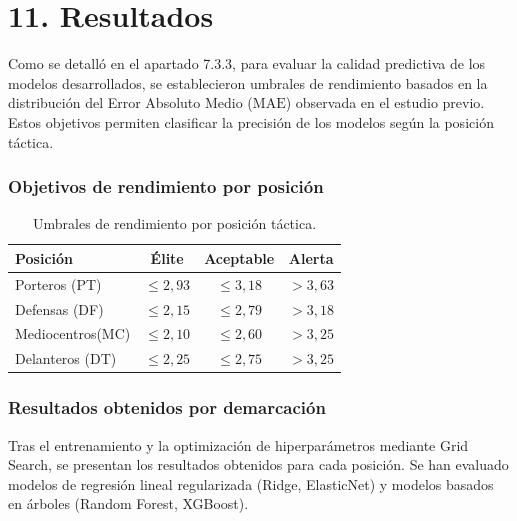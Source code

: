 
\section*{11. Resultados}
\label{sec:resultados}

Como se detalló en el apartado 7.3.3, para evaluar la calidad
predictiva de los modelos desarrollados, se establecieron umbrales
de rendimiento basados en la distribución del Error Absoluto Medio
($\mathrm{MAE}$) observada en el estudio previo. Estos objetivos
permiten clasificar la precisión de los modelos según la posición
táctica.

\subsubsection{Objetivos de rendimiento por posición}
\label{subsubsec:objetivos_rendimiento}

\begin{table}[H]
\centering
\small
\begin{tabular}{|l|c|c|c|}
\hline
\textbf{Posición} & \textbf{Élite} & \textbf{Aceptable} &
\textbf{Alerta} \\
\hline
Porteros    (PT) & $\le 2{,}93$ & $\le 3{,}18$ & $> 3{,}63$ \\
Defensas    (DF) & $\le 2{,}15$ & $\le 2{,}79$ & $> 3{,}18$ \\
Mediocentros(MC) & $\le 2{,}10$ & $\le 2{,}60$ & $> 3{,}25$ \\
Delanteros  (DT) & $\le 2{,}25$ & $\le 2{,}75$ & $> 3{,}25$ \\
\hline
\end{tabular}
\caption{Umbrales de rendimiento por posición táctica.}
\label{tab:umbrales_rendimiento}
\end{table}

\subsubsection{Resultados obtenidos por demarcación}
\label{subsubsec:resultados_demarcacion}

Tras el entrenamiento y la optimización de hiperparámetros mediante
Grid Search, se presentan los resultados obtenidos para cada posición.
Se han evaluado modelos de regresión lineal regularizada (Ridge,
ElasticNet) y modelos basados en árboles (Random Forest, XGBoost).

